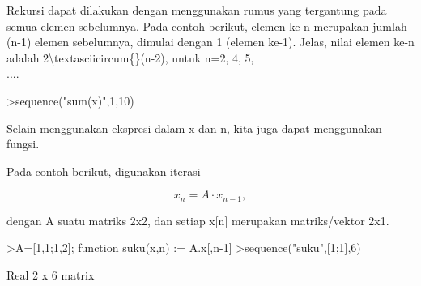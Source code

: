 \documentclass[12pt,Times new roman,letterpaper]{book}
\begin{document}
\begin{eulernootebook}
\begin{eulercomment}
\begin{eulercomment}
\begin{eulernootebook}
\begin{eulercomment}
\begin{eulercomment}
\begin{eulercomment}
\begin{eulercomment}
\begin{eulercomment}
\begin{eulercomment}
\begin{eulernotebook}
\begin{eulercomment}
\begin{eulercomment}
\begin{eulercomment}
\begin{eulercomment}
\begin{eulercomment}
\begin{eulercomment}
\begin{eulercomment}
\begin{eulercomment}
\begin{eulercomment}
\begin{eulercomment}
\begin{eulercomment}
\begin{eulercomment}
\begin{eulercomment}
\begin{eulercomment}
\begin{eulercomment}
\begin{eulercomment}
\begin{eulercomment}
\begin{eulercomment}
\begin{eulercomment}
\begin{eulercomment}
\begin{eulercomment}
\begin{eulercomment}
\begin{eulercomment}
\begin{eulercomment}
\begin{eulercomment}
\begin{eulercomment}
\begin{eulercomment}
Rekursi dapat dilakukan dengan menggunakan rumus yang tergantung pada
semua elemen sebelumnya. Pada contoh berikut, elemen ke-n merupakan
jumlah (n-1) elemen sebelumnya, dimulai dengan 1 (elemen ke-1). Jelas,
nilai elemen ke-n adalah 2\textbackslash{}textasciicircum\{\}(n-2), untuk n=2, 4, 5,\\
....
\end{eulercomment}
\begin{eulerprompt}
>sequence("sum(x)",1,10)
\end{eulerprompt}
\begin{euleroutput}
  [1,  1,  2,  4,  8,  16,  32,  64,  128,  256]
\end{euleroutput}
\begin{eulercomment}
Selain menggunakan ekspresi dalam x dan n, kita juga dapat menggunakan
fungsi.

Pada contoh berikut, digunakan iterasi

\end{eulercomment}
\begin{eulerformula}
\[
x_n =A \cdot x_{n-1},
\]
\end{eulerformula}
\begin{eulercomment}
dengan A suatu matriks 2x2, dan setiap x[n] merupakan matriks/vektor
2x1.
\end{eulercomment}
\begin{eulerprompt}
>A=[1,1;1,2]; function suku(x,n) := A.x[,n-1]
>sequence("suku",[1;1],6)
\end{eulerprompt}
\begin{euleroutput}
  Real 2 x 6 matrix
  

\end{euleroutput}
\end{eulercomment}
\end{eulercomment}
\end{eulercomment}
\end{eulercomment}
\end{eulercomment}
\end{eulercomment}
\end{eulercomment}
\end{eulercomment}
\end{eulercomment}
\end{eulercomment}
\end{eulercomment}
\end{eulercomment}
\end{eulercomment}
\end{eulercomment}
\end{eulercomment}
\end{eulercomment}
\end{eulercomment}
\end{eulercomment}
\end{eulercomment}
\end{eulercomment}
\end{eulercomment}
\end{eulercomment}
\end{eulercomment}
\end{eulercomment}
\end{eulercomment}
\end{eulercomment}
\end{eulernotebook}
\end{eulercomment}
\end{eulercomment}
\end{eulercomment}
\end{eulercomment}
\end{eulercomment}
\end{eulercomment}
\end{eulernootebook}
\end{eulercomment}
\end{eulercomment}
\end{eulernootebook}
\end{document}

